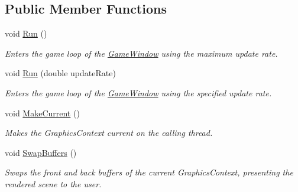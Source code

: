 \subsection*{Public Member Functions}
\begin{DoxyCompactItemize}
\item 
void \hyperlink{interface_open_t_k_1_1_platform_1_1_i_game_window_a07597d249869f2da75e650caafb72f94}{Run} ()
\begin{DoxyCompactList}\small\item\em Enters the game loop of the \hyperlink{class_open_t_k_1_1_game_window}{Game\-Window} using the maximum update rate. \end{DoxyCompactList}\item 
void \hyperlink{interface_open_t_k_1_1_platform_1_1_i_game_window_a60761d038847624f5d1a8beb0b1a6ec2}{Run} (double update\-Rate)
\begin{DoxyCompactList}\small\item\em Enters the game loop of the \hyperlink{class_open_t_k_1_1_game_window}{Game\-Window} using the specified update rate. \end{DoxyCompactList}\item 
void \hyperlink{interface_open_t_k_1_1_platform_1_1_i_game_window_a82429a99533b04e178b4e6b7893efb17}{Make\-Current} ()
\begin{DoxyCompactList}\small\item\em Makes the Graphics\-Context current on the calling thread. \end{DoxyCompactList}\item 
void \hyperlink{interface_open_t_k_1_1_platform_1_1_i_game_window_a1a426b9c39d98f557b702fe4ef91c007}{Swap\-Buffers} ()
\begin{DoxyCompactList}\small\item\em Swaps the front and back buffers of the current Graphics\-Context, presenting the rendered scene to the user. \end{DoxyCompactList}\end{DoxyCompactItemize}
